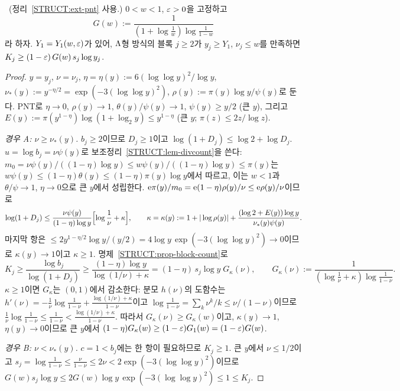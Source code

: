 \begin{lemma}\label{STRUCT:lem-perblock}
\PROVED\ (정리~\ref{STRUCT:ext-pnt} 사용.) $0<w<1$, $\varepsilon>0$을 고정하고
\[
G(w):=\frac{1}{(1+\log\frac1w)\log\frac1{1-w}}
\]
라 하자. $Y_1=Y_1(w,\varepsilon)$가 있어, $\Lambda$형 방식의 블록 $j\ge2$가 $y_j\ge Y_1$, $\nu_j\le w$를 만족하면 $K_j\ge(1-\varepsilon)\,G(w)\,s_j\log y_j$.
\end{lemma}
\begin{proof}
$y=y_j$, $\nu=\nu_j$, $\eta=\eta(y):=6(\log\log y)^2/\log y$, $\nu_*(y):=y^{-\eta/2}=\exp(-3(\log\log y)^2)$, $\rho(y):=\pi(y)\log y/\psi(y)$로 둔다. PNT로 $\eta\to0$, $\rho(y)\to1$, $\theta(y)/\psi(y)\to1$, $\psi(y)\ge y/2$ (큰 $y$), 그리고 $E(y):=\pi(y^{1-\eta})\log(1+\log_2y)\le y^{1-\eta}$ (큰 $y$; $\pi(z)\le2z/\log z$).

\emph{경우 A: $\nu\ge\nu_*(y)$.} $b_j\ge2$이므로 $D_j\ge1$이고 $\log(1+D_j)\le\log2+\log D_j$. $u=\log b_j=\nu\psi(y)$로 보조정리~\ref{STRUCT:lem-divcount}을 쓴다: $m_0=\nu\psi(y)/((1-\eta)\log y)\le w\psi(y)/((1-\eta)\log y)\le\pi(y)$는 $w\psi(y)\le(1-\eta)\theta(y)\le(1-\eta)\pi(y)\log y$에서 따르고, 이는 $w<1$과 $\theta/\psi\to1$, $\eta\to0$으로 큰 $y$에서 성립한다. $\mathrm{e}\pi(y)/m_0=\mathrm{e}(1-\eta)\rho(y)/\nu\le\mathrm{e}\rho(y)/\nu$이므로
\[
\log(1+D_j)\le\frac{\nu\psi(y)}{(1-\eta)\log y}\Bigl[\log\frac1\nu+\kappa\Bigr],\qquad
\kappa=\kappa(y):=1+|\log\rho(y)|+\frac{(\log2+E(y))\log y}{\nu_*(y)\psi(y)} .
\]
마지막 항은 $\le 2y^{1-\eta/2}\log y/(y/2)=4\log y\,\exp(-3(\log\log y)^2)\to0$이므로 $\kappa(y)\to1$이고 $\kappa\ge1$. 명제~\ref{STRUCT:prop-block-count}로
\[
K_j\ge\frac{\log b_j}{\log(1+D_j)}\ge\frac{(1-\eta)\log y}{\log(1/\nu)+\kappa}=(1-\eta)\,s_j\log y\;G_\kappa(\nu),\qquad G_\kappa(\nu):=\frac1{(\log\frac1\nu+\kappa)\log\frac1{1-\nu}} .
\]
$\kappa\ge1$이면 $G_\kappa$는 $(0,1)$에서 감소한다: 분모 $h(\nu)$의 도함수는 $h'(\nu)=-\frac1\nu\log\frac1{1-\nu}+\frac{\log(1/\nu)+\kappa}{1-\nu}$이고 $\log\frac1{1-\nu}=\sum_k\nu^k/k\le\nu/(1-\nu)$이므로 $\frac1\nu\log\frac1{1-\nu}\le\frac1{1-\nu}<\frac{\log(1/\nu)+\kappa}{1-\nu}$. 따라서 $G_\kappa(\nu)\ge G_\kappa(w)$이고, $\kappa(y)\to1$, $\eta(y)\to0$이므로 큰 $y$에서 $(1-\eta)G_{\kappa}(w)\ge(1-\varepsilon)G_1(w)=(1-\varepsilon)G(w)$.

\emph{경우 B: $\nu<\nu_*(y)$.} $c=1<b_j$에는 한 항이 필요하므로 $K_j\ge1$. 큰 $y$에서 $\nu\le1/2$이고 $s_j=\log\frac1{1-\nu}\le\frac{\nu}{1-\nu}\le2\nu<2\exp(-3(\log\log y)^2)$이므로 $G(w)s_j\log y\le2G(w)\log y\,\exp(-3(\log\log y)^2)\le1\le K_j$.
\end{proof}

